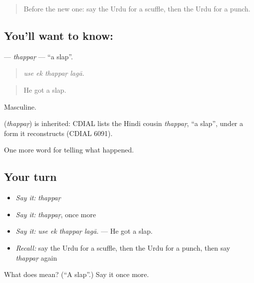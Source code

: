 \begin{quote}
Before the new one: say the Urdu for a scuffle, then the Urdu for a punch.
\end{quote}

\subsection*{You'll want to know: }
\textbf{} — \emph{thappaṛ} — \textquotedblleft{}a slap\textquotedblright{}.

\begin{quote}
   
\end{quote}

\begin{quote}
\emph{use ek thappaṛ lagā.}
\end{quote}

\begin{quote}
He got a slap.
\end{quote}

Masculine.

\begin{cousinweb}
\textbf{} (\emph{thappaṛ}) is inherited: CDIAL lists the Hindi cousin \emph{thappaṛ}, \textquotedblleft{}a slap\textquotedblright{}, under a form it reconstructs (CDIAL 6091).
\end{cousinweb}

\begin{grammarlens}[title={What you've built}]
One more word for telling what happened.
\end{grammarlens}

\subsection*{Your turn}
\begin{itemize}
\raggedright
  \item \emph{Say it:} \emph{thappaṛ}
  \item \emph{Say it:} \emph{thappaṛ}, once more
  \item \emph{Say it:} \emph{use ek thappaṛ lagā.} — He got a slap.
  \item \emph{Recall:} say the Urdu for a scuffle, then the Urdu for a punch, then say \emph{thappaṛ} again
\end{itemize}

\begin{tcolorbox}[breakable,colback=teal!4,colframe=teal!35!black,title={Before you move on}]
What does  mean? (\textquotedblleft{}A slap\textquotedblright{}.) Say it once more.
\end{tcolorbox}
